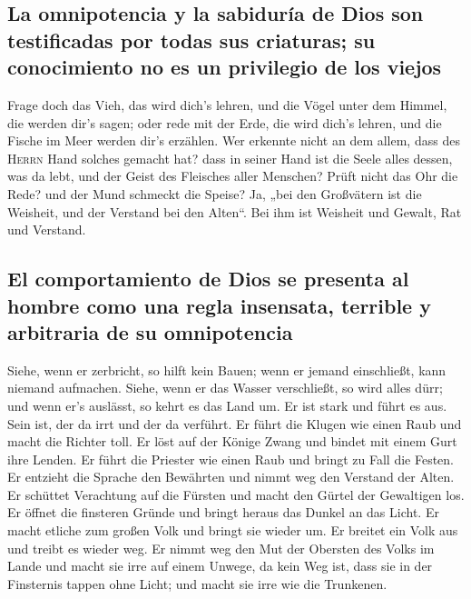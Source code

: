 \hypertarget{la-omnipotencia-y-la-sabiduruxeda-de-dios-son-testificadas-por-todas-sus-criaturas-su-conocimiento-no-es-un-privilegio-de-los-viejos}{%
\subsection{La omnipotencia y la sabiduría de Dios son testificadas por
todas sus criaturas; su conocimiento no es un privilegio de los
viejos}\label{la-omnipotencia-y-la-sabiduruxeda-de-dios-son-testificadas-por-todas-sus-criaturas-su-conocimiento-no-es-un-privilegio-de-los-viejos}}

 Frage doch das Vieh, das wird dich's lehren, und die
Vögel unter dem Himmel, die werden dir's sagen;  oder rede
mit der Erde, die wird dich's lehren, und die Fische im Meer werden
dir's erzählen.  Wer erkennte nicht an dem allem, dass des
\textsc{Herrn} Hand solches gemacht hat?  dass in seiner
Hand ist die Seele alles dessen, was da lebt, und der Geist des
Fleisches aller Menschen?  Prüft nicht das Ohr die Rede?
und der Mund schmeckt die Speise?  Ja, „bei den
Großvätern ist die Weisheit, und der Verstand bei den Alten``.
 Bei ihm ist Weisheit und Gewalt, Rat und Verstand.

\hypertarget{el-comportamiento-de-dios-se-presenta-al-hombre-como-una-regla-insensata-terrible-y-arbitraria-de-su-omnipotencia}{%
\subsection{El comportamiento de Dios se presenta al hombre como una
regla insensata, terrible y arbitraria de su
omnipotencia}\label{el-comportamiento-de-dios-se-presenta-al-hombre-como-una-regla-insensata-terrible-y-arbitraria-de-su-omnipotencia}}

 Siehe, wenn er zerbricht, so hilft kein Bauen; wenn er
jemand einschließt, kann niemand aufmachen.  Siehe, wenn
er das Wasser verschließt, so wird alles dürr; und wenn er's auslässt,
so kehrt es das Land um.  Er ist stark und führt es aus.
Sein ist, der da irrt und der da verführt.  Er führt die
Klugen wie einen Raub und macht die Richter toll.  Er
löst auf der Könige Zwang und bindet mit einem Gurt ihre Lenden.
 Er führt die Priester wie einen Raub und bringt zu Fall
die Festen.  Er entzieht die Sprache den Bewährten und
nimmt weg den Verstand der Alten.  Er schüttet Verachtung
auf die Fürsten und macht den Gürtel der Gewaltigen los. 
Er öffnet die finsteren Gründe und bringt heraus das Dunkel an das
Licht.  Er macht etliche zum großen Volk und bringt sie
wieder um. Er breitet ein Volk aus und treibt es wieder weg.
 Er nimmt weg den Mut der Obersten des Volks im Lande und
macht sie irre auf einem Unwege, da kein Weg ist,  dass
sie in der Finsternis tappen ohne Licht; und macht sie irre wie die
Trunkenen.

